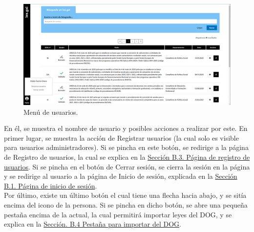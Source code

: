 \begin{figure}[H]
\centerline{\includegraphics[width=15cm]{figuras/manualUsuario/OpcionesUsuario.PNG}}
\caption{Menú de usuarios.}
\label{enlacePMenuUsuarios}
\end{figure}

En él, se muestra el nombre de usuario y posibles acciones a realizar por este. En primer lugar, se muestra la acción de Registrar usuarios (la cual solo es visible para usuarios administradores). Si se pincha en este botón, se redirige a la página de Registro de usuarios, la cual se explica en la \hyperref[PInicioSesion]{Sección B.3. Página de registro de usuarios}. Si se pincha en el botón de Cerrar sesión, se cierra la sesión en la página y se redirige al usuario a la página de Inicio de sesión, explicada en la \hyperref[PInicioSesion]{Sección B.1. Página de inicio de sesión}.
\\

Por último, existe un último botón el cual tiene una flecha hacia abajo, y se sitía encima del icono de la persona. Si se pincha en dicho botón, se abre una pequeña pestaña encima de la actual, la cual permitirá importar leyes del DOG, y se explica en la \hyperref[PBusquedaDOG]{Sección. B.4 Pestaña para importar del DOG}.